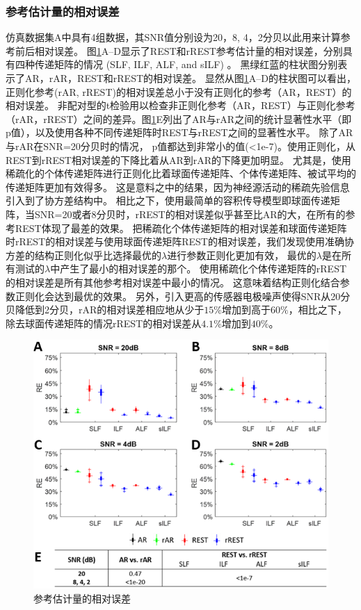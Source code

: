 \subsubsection{参考估计量的相对误差}
仿真数据集A中具有4组数据，其SNR值分别设为20，8, 4，2分贝以此用来计算参考前后相对误差。 图\ref{3.4}A–D显示了REST和rREST参考估计量的相对误差，分别具有四种传递矩阵的情况 (SLF, ILF, ALF, and sILF) 。 黑绿红蓝的柱状图分别表示了AR，rAR，REST和rREST的相对误差。 显然从图\ref{3.4}A–D的柱状图可以看出，正则化参考(rAR, rREST)的相对误差总小于没有正则化的参考（AR，REST）的相对误差。 非配对型的t检验用以检查非正则化参考（AR，REST）与正则化参考（rAR，rREST）之间的差异。图\ref{3.4}E列出了AR与rAR之间的统计显著性水平（即p值），以及使用各种不同传递矩阵时REST与rREST之间的显著性水平。 除了AR与rAR在SNR=20分贝时的情况， p值都达到非常小的值(<1e-7)。使用正则化，从REST到rREST相对误差的下降比着从AR到rAR的下降更加明显。 尤其是，使用稀疏化的个体传递矩阵进行正则化比着球面传递矩阵、个体传递矩阵、被试平均的传递矩阵更加有效得多。 这是意料之中的结果，因为神经源活动的稀疏先验信息引入到了协方差结构中。 相比之下，使用最简单的容积传导模型即球面传递矩阵，当SNR=20或者8分贝时，rREST的相对误差似乎甚至比AR的大，在所有的参考REST体现了最差的效果。 把稀疏化个体传递矩阵的相对误差和球面传递矩阵时rREST的相对误差与使用球面传递矩阵REST的相对误差，我们发现使用准确协方差的结构正则化似乎比选择最优的$\lambda$进行参数正则化更加有效， 最优的$\lambda$是在所有测试的$\lambda$中产生了最小的相对误差的那个。 使用稀疏化个体传递矩阵的rREST的相对误差是所有其他参考相对误差中最小的情况。 这意味着结构正则化结合参数正则化会达到最优的效果。 另外，引入更高的传感器电极噪声使得SNR从20分贝降低到2分贝，rAR的相对误差相应地从少于$15\%$增加到高于$60\%$，相比之下，除去球面传递矩阵的情况rREST的相对误差从$4.1\%$增加到$40\%$。
\begin{figure}[!ht]
	\centering
	\includegraphics[width=15cm]{pic/Frontier/figure4.png}
	\caption{参考估计量的相对误差}
	\label{3.4}
\end{figure}

